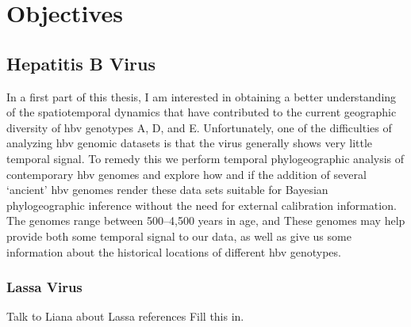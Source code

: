 \chapter{Objectives}
\label{ch:objectives}


\section{Hepatitis B Virus}

In a first part of this thesis, I am interested in obtaining a better understanding of the spatiotemporal dynamics that have contributed to the current geographic diversity of \gls{hbv} genotypes A, D, and E.
Unfortunately, one of the difficulties of analyzing \gls{hbv} genomic datasets is that the virus generally shows very little temporal signal.
To remedy this we perform temporal phylogeographic analysis of contemporary \gls{hbv} genomes and explore how and if the addition of several `ancient' \gls{hbv} genomes render these data sets suitable for Bayesian phylogeographic inference without the need for external calibration information. %
The genomes range between 500--4,500 years in age, and %
These genomes may help provide both some temporal signal to our data, as well as give us some information about the historical locations of different \gls{hbv} genotypes.



\subsection{Lassa Virus} %

Talk to Liana about Lassa references %
Fill this in.

